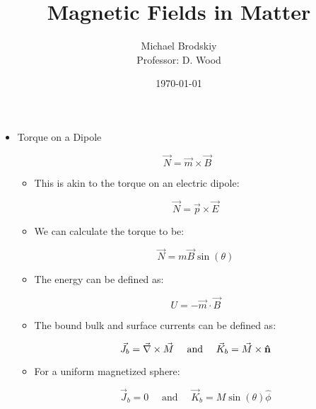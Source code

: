 


\title{Magnetic Fields in Matter}
\date{\today}
\author{Michael Brodskiy\\ \small Professor: D. Wood}



\maketitle

\begin{itemize}

  \item Torque on a Dipole

    $$\vec{N}=\vec{m}\times\vec{B}$$

    \begin{itemize}

      \item This is akin to the torque on an electric dipole:

        $$\vec{N}=\vec{p}\times\vec{E}$$

      \item We can calculate the torque to be:

        $$\vec{N}=m\vec{B}\sin(\theta)$$

      \item The energy can be defined as:

        $$U=-\vec{m}\cdot\vec{B}$$

      \item The bound bulk and surface currents can be defined as:

        $$\vec{J}_b=\vec{\nabla}\times\vec{M}\quad\text{ and }\quad\vec{K}_b=\vec{M}\times\bold{\hat{n}}$$

      \item For a uniform magnetized sphere:

        $$\vec{J}_b=0\quad\text{ and }\quad\vec{K}_b=M\sin(\theta)\hat{\phi}$$

    \end{itemize}

\end{itemize}



